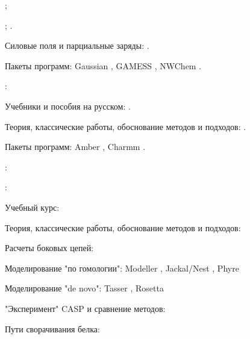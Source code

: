  \cite{Ландау_1,Ландау_2,Ландау_3,Ландау_5,Фейнман_rus,Морс_1,Морс_2};  \cite{Фейнман_eng,Morse_eng}


 \cite{Вирт_1982,Керниган_1992}; \cite{Wirth_eng,Kernighan_1978,Stroustrup_1985}.


Силовые поля и парциальные заряды: \cite{Gasteiger_1980,Mulliken_1955,Jakalian_2000,Hehre_1969}.

Пакеты программ: Gaussian \parencite{g09}, GAMESS \parencite{Schmidt_1993}, NWChem \parencite{Valiev_2010}.

: \cite{Skjærven_2014,Hollup_2005}


Учебники и пособия на русском: \cite{Холмодуров_2003,Хохлов_2009}.

Теория, классические работы, обоснование методов и подходов: \cite{Alder_1957,Verlet_1967,Berendsen_1984,Cornell_1995,Bultinck_2002,Bonvin_2010,Андрианов_2013}.

Пакеты программ: Amber \parencite{Case_2005}, Charmm \parencite{Brooks_2009}.

: \cite{Berendsen_1981,Onufriev_2002,Olsson_2011,Hou_2011,}

:

Учебный курс: \cite{Финкельштейн_2012}

Теория, классические работы, обоснование методов и подходов: \cite{Finkelstein_1994,Karplus_1997,Galaktionov_2001,McCammmon_1977,Liwo_2005}

Расчеты боковых цепей: \cite{Wang_2008,Xu_2006}

Моделирование "по гомологии": Modeller \parencite{Sali_1993}, Jackal/Nest \parencite{Xiang_2006}, Phyre \parencite{Kelley_2009}

Моделирование "de novo": Tasser \parencite{Yang_2015}, Rosetta \parencite{Das_2008}

"Эксперимент" CASP и сравнение методов: \cite{Moult_2016}

Пути сворачивания белка: \cite{Connaughton_2004,Ngo_1992,Orengo_1993,Efimiv_1994,Tsai_2000,Козырев_2010,Bellman_1952}

